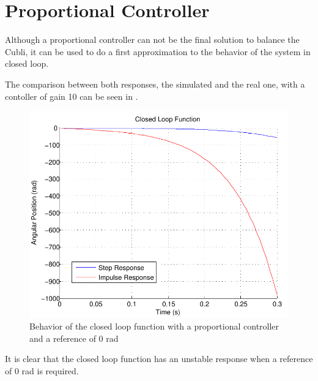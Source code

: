 \section{Proportional Controller}\label{chap:pController}
Although a proportional controller can not be the final solution to balance the Cubli, it can be used to do a first approximation to the behavior of the system in closed loop.

The comparison between both responses, the simulated and the real one, with a contoller of gain 10 can be seen in . 

\begin{figure}[H] 
	\centering 
	\includegraphics[scale=0.6]{figures/closedLoopResponse}	
	\caption{Behavior of the closed loop function with a proportional controller and a reference of 0 rad}
	\label{closedLoopResponse}
\end{figure}
It is clear that the closed loop function has an unstable response when a reference of 0 rad is required.
